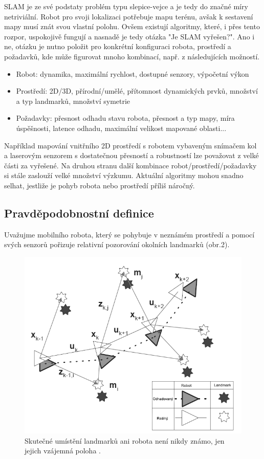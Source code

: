 \documentclass[12pt,a4paper]{article}
\begin{document}
\newpage
SLAM je ze své podstaty problém typu slepice-vejce a je tedy do značné míry netriviální. Robot pro svoji lokalizaci potřebuje mapu terénu, avšak k sestavení mapy musí znát svou vlastní polohu. Ovšem existují algoritmy, které, i přes tento rozpor, uspokojivě fungují a nasnadě je tedy otázka "Je SLAM vyřešen?". Ano i ne, otázku je nutno položit pro konkrétní konfiguraci robota, prostředí a požadavků, kde může figurovat mnoho kombinací, např. z následujících možností.
\begin{itemize}
\item Robot: dynamika, maximální rychlost, dostupné senzory, výpočetní výkon
\item Prostředí: 2D/3D, přírodní/umělé, přítomnost dynamických prvků, množství a typ landmarků, množství symetrie
\item Požadavky: přesnost odhadu stavu robota, přesnost a typ mapy, míra úspěšnosti, latence odhadu, maximální velikost mapované oblasti...
\end{itemize}
Například mapování vnitřního 2D prostředí s robotem vybaveným snímačem kol a laserovým senzorem s dostatečnou přesností a robustností lze považovat z velké části za vyřešené. Na druhou stranu další kombinace robot/prostředí/požadavky si stále zaslouží velké množství výzkumu. Aktuální algoritmy mohou snadno selhat, jestliže je pohyb robota nebo prostředí příliš náročný.


\subsection{Pravděpodobnostní definice}
Uvažujme mobilního robota, který se pohybuje v neznámém prostředí a pomocí svých senzorů pořizuje relativní pozorování okolních landmarků (obr.2).

\begin{figure}[H]
\centering
\includegraphics[scale=0.6]{img/Obr2_b}
\caption{Skutečné umístění landmarků ani robota není nikdy známo, jen jejich vzájemná poloha \cite{Durrant-Whyte}.}
\end{figure}
\end{document}
